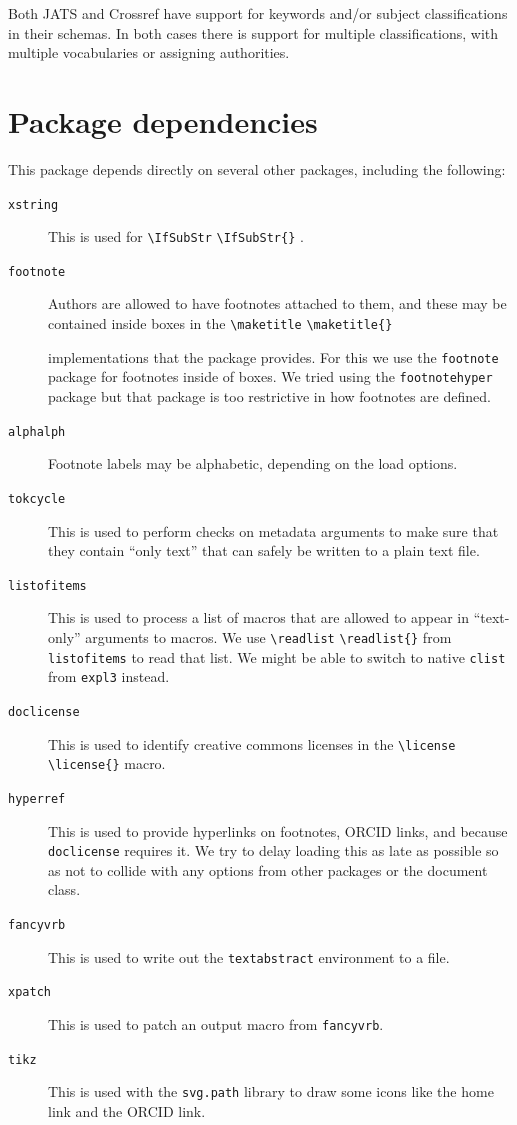 \documentclass{article}
\newcommand{\cmd}[2][]{%
  \def\FirstArg{#1}%
  \ifx\FirstArg\empty%
    \texttt{\textbackslash{}#2}%
  \else%
    \texttt{\textbackslash{}#2\{#1\}}%
  \fi
}
\begin{document}
\begin{description}
Both JATS and Crossref have support for keywords and/or subject classifications in
their schemas. In both cases there is support for multiple classifications, with multiple
vocabularies or assigning authorities.
\end{description}
\section{Package dependencies}
This package depends directly on several other packages, including the following:
\begin{description}
\item[\texttt{xstring}] This is used for \cmd{IfSubStr}.
\item[\texttt{footnote}] Authors are allowed to have footnotes attached to
them, and these may be contained inside boxes in the \cmd{maketitle}
implementations that the package provides. For this we use the
\texttt{footnote} package for footnotes inside of boxes. We tried using the
\texttt{footnotehyper} package but that package is too restrictive in how
footnotes are defined.
\item[\texttt{alphalph}] Footnote labels may be alphabetic, depending on the
load options.
\item[\texttt{tokcycle}] This is used to perform checks on metadata arguments
to make sure that they contain ``only text'' that can safely be written to a plain
text file.
\item[\texttt{listofitems}] This is used to process a list of macros that are
allowed to appear in ``text-only'' arguments to macros. We use \cmd{readlist} from
\texttt{listofitems} to read that list. We might be able to switch to native
\texttt{clist} from \texttt{expl3} instead.
\item[\texttt{doclicense}] This is used to identify creative commons
licenses in the \cmd{license} macro.
\item[\texttt{hyperref}] This is used to provide hyperlinks on footnotes,
ORCID links, and because \texttt{doclicense} requires it. We try to delay
loading this as late as possible so as not to collide with any options from
other packages or the document class.
\item[\texttt{fancyvrb}] This is used to write out the \texttt{textabstract}
environment to a file.
\item[\texttt{xpatch}] This is used to patch an output macro from \texttt{fancyvrb}.
\item[\texttt{tikz}] This is used with the \texttt{svg.path} library to draw
some icons like the home link and the ORCID link.
\end{description}
\end{document}
